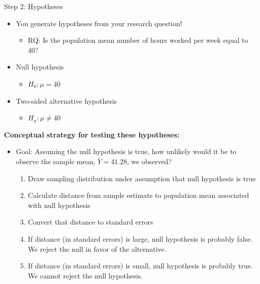 \documentclass[
  8pt,
  ignorenonframetext,
  dvipsnames]{beamer}
\providecommand{\tightlist}{%
  \setlength{\itemsep}{0pt}\setlength{\parskip}{0pt}}
\renewcommand{\textbf}[1]{{\color{darkgray}\bfseries\fontfamily{Montserrat-TOsF}#1}}
\let\olditem\item
\renewcommand{\item}{%
  \olditem\vspace{4pt}
}
\begin{document}
\begin{frame}{Step 2: Hypotheses}
\protect\hypertarget{step-2-hypotheses}{}

\begin{itemize}
\tightlist
\item
  You generate hypotheses from your research question!

  \begin{itemize}
  \tightlist
  \item
    RQ: Is the population mean number of hours worked per week equal to
    40?
  \end{itemize}
\end{itemize}

\medskip

\begin{itemize}
\tightlist
\item
  Null hypothesis

  \begin{itemize}
  \tightlist
  \item
    \(H_0: \mu = 40\)
  \end{itemize}
\item
  Two-sided alternative hypothesis

  \begin{itemize}
  \tightlist
  \item
    \(H_a: \mu \ne 40\)
  \end{itemize}
\end{itemize}

\medskip

\textbf{Conceptual strategy for testing these hypotheses:}

\begin{itemize}
\item
  Goal: Assuming the null hypothesis is true, how unlikely would it be
  to observe the sample mean, \(\bar{Y} = 41.28\), we observed?

  \begin{enumerate}
  \tightlist
  \item
    Draw sampling distribution under assumption that null hypothesis is
    true
  \item
    Calculate distance from sample estimate to population mean
    associated with null hypothesis
  \item
    Convert that distance to standard errors
  \item
    If distance (in standard errors) is large, null hypothesis is
    probably false. We reject the null in favor of the alternative.
  \item
    If distance (in standard errors) is small, null hypothesis is
    probably true. We cannot reject the null hypothesis.
  \end{enumerate}
\end{itemize}

\end{frame}
\end{document}
